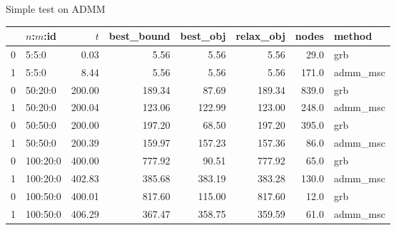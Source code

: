 \begin{frame}{Simple test on ADMM}
  \begin{tabular}{llrrrrrl}
    \toprule
    {} & $n$:$m$:id & $t$    & best\_bound & best\_obj & relax\_obj & nodes & method    \\
    \midrule
    0  & 5:5:0      & 0.03   & 5.56        & 5.56      & 5.56       & 29.0  & grb       \\
    1  & 5:5:0      & 8.44   & 5.56        & 5.56      & 5.56       & 171.0 & admm\_msc \\
    0  & 50:20:0    & 200.00 & 189.34      & 87.69     & 189.34     & 839.0 & grb       \\
    1  & 50:20:0    & 200.04 & 123.06      & 122.99    & 123.00     & 248.0 & admm\_msc \\
    0  & 50:50:0    & 200.00 & 197.20      & 68.50     & 197.20     & 395.0 & grb       \\
    1  & 50:50:0    & 200.39 & 159.97      & 157.23    & 157.36     & 86.0  & admm\_msc \\
    0  & 100:20:0   & 400.00 & 777.92      & 90.51     & 777.92     & 65.0  & grb       \\
    1  & 100:20:0   & 402.83 & 385.68      & 383.19    & 383.28     & 130.0 & admm\_msc \\
    0  & 100:50:0   & 400.01 & 817.60      & 115.00    & 817.60     & 12.0  & grb       \\
    1  & 100:50:0   & 406.29 & 367.47      & 358.75    & 359.59     & 61.0  & admm\_msc \\
    \bottomrule
  \end{tabular}
\end{frame}
\begin{frame}
  \scriptsize
  \printbibliography
\end{frame}
